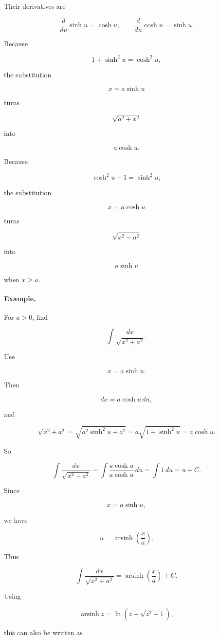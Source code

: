 Their derivatives are

\[
\frac{d}{du}\sinh u=\cosh u,
\qquad
\frac{d}{du}\cosh u=\sinh u.
\]

Because

\[
1+\sinh^2u=\cosh^2u,
\]

the substitution

\[
x=a\sinh u
\]

turns

\[
\sqrt{a^2+x^2}
\]

into

\[
a\cosh u.
\]

Because

\[
\cosh^2u-1=\sinh^2u,
\]

the substitution

\[
x=a\cosh u
\]

turns

\[
\sqrt{x^2-a^2}
\]

into

\[
a\sinh u
\]

when \(x\ge a\).

\paragraph{Example.}
For \(a>0\), find

\[
\int \frac{dx}{\sqrt{x^2+a^2}}.
\]

Use

\[
x=a\sinh u.
\]

Then

\[
dx=a\cosh u\,du,
\]

and

\[
\sqrt{x^2+a^2}
=
\sqrt{a^2\sinh^2u+a^2}
=
a\sqrt{1+\sinh^2u}
=
a\cosh u.
\]

So

\[
\int \frac{dx}{\sqrt{x^2+a^2}}
=
\int \frac{a\cosh u}{a\cosh u}\,du
=
\int 1\,du
=
u+C.
\]

Since

\[
x=a\sinh u,
\]

we have

\[
u=\operatorname{arsinh}\left(\frac{x}{a}\right).
\]

Thus

\[
\boxed{
\int \frac{dx}{\sqrt{x^2+a^2}}
=
\operatorname{arsinh}\left(\frac{x}{a}\right)+C.
}
\]

Using

\[
\operatorname{arsinh} z=\ln\left(z+\sqrt{z^2+1}\right),
\]

this can also be written as

